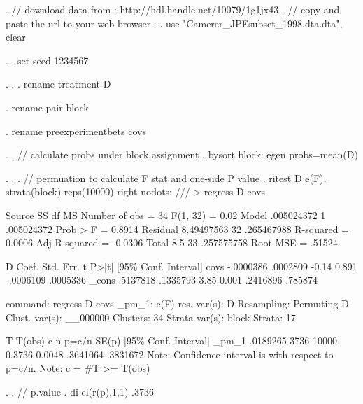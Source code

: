 . // download data from : http://hdl.handle.net/10079/1g1jx43
. // copy and paste the url to your web browser
. 
. use "Camerer_JPEsubset_1998.dta.dta", clear 

. 
. set seed 1234567

. 
. 
.         rename treatment D

.         rename pair block

.         rename preexperimentbets covs

. 
.         // calculate probs under block assignment
.         bysort block: egen probs=mean(D)

.         
.                 
.         // permuation to calculate F stat and one-side P value
.         ritest D e(F), strata(block) reps(10000) right nodots: ///
>         regress D covs

      Source {\VBAR}       SS           df       MS      Number of obs   =        34
   F(1, 32)        =      0.02
       Model {\VBAR}  .005024372         1  .005024372   Prob > F        =    0.8914
    Residual {\VBAR}  8.49497563        32  .265467988   R-squared       =    0.0006
   Adj R-squared   =   -0.0306
       Total {\VBAR}         8.5        33  .257575758   Root MSE        =    .51524

           D {\VBAR}      Coef.   Std. Err.      t    P>|t|     [95\% Conf. Interval]
        covs {\VBAR}  -.0000386   .0002809    -0.14   0.891    -.0006109    .0005336
       _cons {\VBAR}   .5137818   .1335793     3.85   0.001     .2416896     .785874

      command:  regress D covs
        _pm_1:  e(F)
  res. var(s):  D
   Resampling:  Permuting D
Clust. var(s):  __000000
     Clusters:  34
Strata var(s):  block
       Strata:  17

T            {\VBAR}     T(obs)       c       n   p=c/n   SE(p) [95\% Conf. Interval]
       _pm_1 {\VBAR}   .0189265    3736   10000  0.3736  0.0048  .3641064   .3831672
Note: Confidence interval is with respect to p=c/n.
Note: c = \#{\lbr}T >= T(obs){\rbr}

. 
.         // p.value
.         di el(r(p),1,1)
.3736

